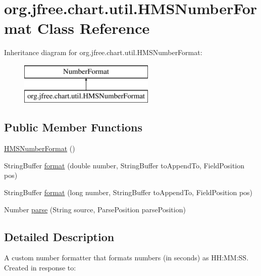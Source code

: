 \hypertarget{classorg_1_1jfree_1_1chart_1_1util_1_1_h_m_s_number_format}{}\section{org.\+jfree.\+chart.\+util.\+H\+M\+S\+Number\+Format Class Reference}
\label{classorg_1_1jfree_1_1chart_1_1util_1_1_h_m_s_number_format}
Inheritance diagram for org.\+jfree.\+chart.\+util.\+H\+M\+S\+Number\+Format\+:\begin{figure}[H]
\begin{center}
\leavevmode
\includegraphics[height=2.000000cm]{classorg_1_1jfree_1_1chart_1_1util_1_1_h_m_s_number_format}
\end{center}
\end{figure}
\subsection*{Public Member Functions}
\begin{DoxyCompactItemize}
\item 
\mbox{\hyperlink{classorg_1_1jfree_1_1chart_1_1util_1_1_h_m_s_number_format_aaf45038815e15733bf3c0b0e59c11863}{H\+M\+S\+Number\+Format}} ()
\item 
String\+Buffer \mbox{\hyperlink{classorg_1_1jfree_1_1chart_1_1util_1_1_h_m_s_number_format_a258ffdf599b7783276062a339fba0bfd}{format}} (double number, String\+Buffer to\+Append\+To, Field\+Position pos)
\item 
String\+Buffer \mbox{\hyperlink{classorg_1_1jfree_1_1chart_1_1util_1_1_h_m_s_number_format_a73094db9a59f65c433179ec0ab68aba0}{format}} (long number, String\+Buffer to\+Append\+To, Field\+Position pos)
\item 
Number \mbox{\hyperlink{classorg_1_1jfree_1_1chart_1_1util_1_1_h_m_s_number_format_ad0acb9921117825d467323d226d8419c}{parse}} (String source, Parse\+Position parse\+Position)
\end{DoxyCompactItemize}


\subsection{Detailed Description}
A custom number formatter that formats numbers (in seconds) as H\+H\+:\+MM\+:SS. Created in response to\+:

